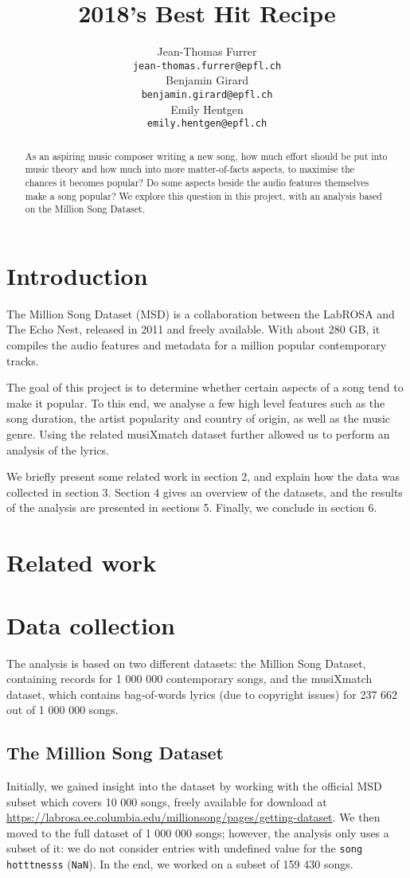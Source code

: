 \documentclass[11pt]{article}
\title{2018's Best Hit Recipe}
\author{Jean-Thomas Furrer \\
  {\small\tt jean-thomas.furrer@epfl.ch} \\\And
  Benjamin Girard \\
  {\small\tt benjamin.girard@epfl.ch} \\\And
  Emily Hentgen \\
{\small\tt emily.hentgen@epfl.ch} \\}
\date{}
\renewcommand\_{\textunderscore\allowbreak}
\begin{document}
\maketitle
\begin{abstract}


As an aspiring music composer writing a new song, how much effort should be put into music theory and how much into more matter-of-facts aspects, to maximise the chances it becomes popular?
Do some aspects beside the audio features themselves make a song popular?
We explore this question in this project, with an analysis based on the Million Song Dataset.
\end{abstract}


\section{Introduction}
The Million Song Dataset (MSD) is a collaboration between the LabROSA and The Echo Nest, released in 2011 and freely available.
With about 280 GB, it compiles the audio features and metadata for a million popular contemporary tracks. 

The goal of this project is to determine whether certain aspects of a song tend to make it popular.
To this end, we analyse a few high level features such as the song duration, the artist popularity and country of origin, as well as the music genre. 
Using the related musiXmatch dataset further allowed us to perform an analysis of the lyrics.

We briefly present some related work in section 2, and explain how the data was collected in section 3. Section 4 gives an overview of the datasets, and the results of the analysis are presented in sections 5. Finally, we conclude in section 6.

\section{Related work}

\section{Data collection}
The analysis is based on two different datasets: the Million Song Dataset, containing records for 1 000 000 contemporary songs, and the musiXmatch dataset, which contains bag-of-words lyrics (due to copyright issues) for 237 662 out of 1 000 000 songs.

\subsection{The Million Song Dataset}
Initially, we gained insight into the dataset by working with the official MSD subset which covers 10 000 songs, freely available for download at \url{https://labrosa.ee.columbia.edu/millionsong/pages/getting-dataset}.
We then moved to the full dataset of 1 000 000 songs; however, the analysis only uses a subset of it: we do not consider entries with undefined value for the \texttt{song hotttnesss} (\texttt{NaN}).
In the end, we worked on a subset of 159 430 songs.
\end{document}
